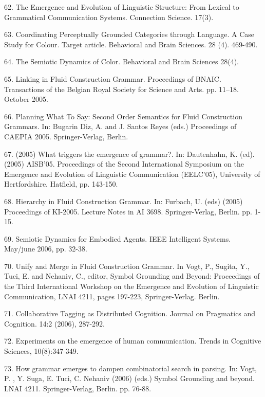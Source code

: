 62. \citet{Steels:05a} The Emergence and Evolution of Linguistic Structure: From Lexical to Grammatical Communication Systems. Connection Science. 17(3). 

63. \citet{Steels:05b} Coordinating Perceptually Grounded Categories through Language. A Case Study for Colour. Target article. Behavioral and Brain Sciences. 28 (4). 469-490. 

64. \citet{Steels:05c} The Semiotic Dynamics of Color. Behavioral and Brain Sciences 28(4). 

65. \citet{Steels:05d} Linking in Fluid Construction Grammar. Proceedings of BNAIC. Transactions of the Belgian Royal Society for 
Science and Arts. pp. 11--18. October 2005.  

66. \citet{Steels:05e} Planning What To Say: Second Order Semantics for Fluid Construction Grammars. 
In: Bugarin Diz, A. and J. Santos Reyes (eds.) Proceedings of CAEPIA 2005. Springer-Verlag, Berlin. 

67. \citet{Steels:05f} (2005) What triggers the emergence of grammar?. In: Dautenhahn, K. (ed). (2005) AISB'05.  Proceedings of the 
Second International Symposium on the Emergence and Evolution of Linguistic Communication (EELC'05), University of Hertfordshire. Hatfield, pp. 143-150. 

68. \citet{Steels:05g} Hierarchy in Fluid Construction Grammar. 
In: Furbach, U. (eds) (2005) Proceedings of KI-2005. Lecture Notes in AI 3698. Springer-Verlag, Berlin. pp. 1-15. 

69. \citet{Steels:06a} Semiotic Dynamics for Embodied Agents. IEEE Intelligent Systems. May/june 2006, pp. 32-38. 

70. \citet{Steels:06b} Unify and Merge in Fluid Construction Grammar. In Vogt, P., Sugita, Y., Tuci, E. and Nehaniv, C., editor, Symbol Grounding and Beyond: Proceedings of the Third International Workshop on the Emergence and Evolution of Linguistic Communication, LNAI 4211, pages 197-223, Springer-Verlag. Berlin. 

71. \citet{Steels:06c} Collaborative Tagging as Distributed Cognition. Journal on 
Pragmatics and Cognition. 14:2 (2006), 287-292. 

72. \citet{Steels:06d} Experiments on the emergence of human communication. Trends in Cognitive Sciences, 10(8):347-349.

73. \citet{Steels:06e} How grammar emerges to dampen combinatorial search in parsing. In: Vogt, P. , Y. Suga, E. Tuci, C. Nehaniv (2006) (eds.) Symbol Grounding and beyond. LNAI 4211. Springer-Verlag, Berlin. pp. 76-88. 

